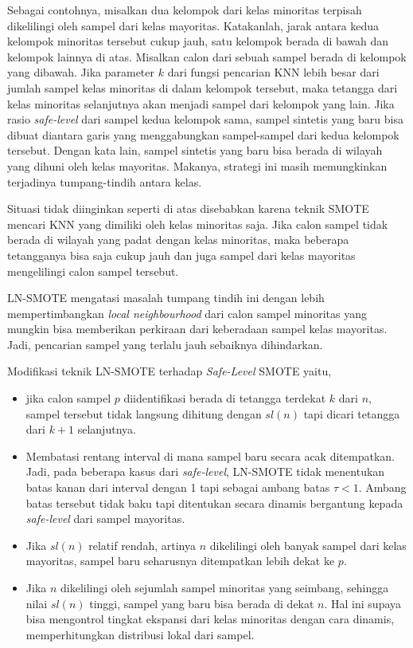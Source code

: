 Sebagai contohnya, misalkan dua kelompok dari kelas minoritas terpisah
dikelilingi oleh sampel dari kelas mayoritas.
Katakanlah, jarak antara kedua kelompok minoritas tersebut cukup jauh, satu
kelompok berada di bawah dan kelompok lainnya di atas.
Misalkan calon dari sebuah sampel berada di kelompok yang dibawah.
Jika parameter $ k $ dari fungsi pencarian KNN lebih besar dari jumlah sampel
kelas minoritas di dalam kelompok tersebut, maka tetangga dari kelas minoritas
selanjutnya akan menjadi sampel dari kelompok yang lain.
Jika rasio \textit{safe-level} dari sampel kedua kelompok sama, sampel sintetis
yang baru bisa dibuat diantara garis yang menggabungkan sampel-sampel dari
kedua kelompok tersebut.
Dengan kata lain, sampel sintetis yang baru bisa berada di wilayah yang dihuni
oleh kelas mayoritas.  Makanya, strategi ini masih memungkinkan terjadinya
tumpang-tindih antara kelas.

Situasi tidak diinginkan seperti di atas disebabkan karena teknik SMOTE mencari
KNN yang dimiliki oleh kelas minoritas saja.
Jika calon sampel tidak berada di wilayah yang padat dengan kelas minoritas,
maka beberapa tetangganya bisa saja cukup jauh dan juga sampel dari kelas
mayoritas mengelilingi calon sampel tersebut.

LN-SMOTE mengatasi masalah tumpang tindih ini dengan lebih mempertimbangkan
\textit{local neighbourhood} dari calon sampel minoritas yang mungkin bisa
memberikan perkiraan dari keberadaan sampel kelas mayoritas.
Jadi, pencarian sampel yang terlalu jauh sebaiknya dihindarkan.

Modifikasi teknik LN-SMOTE terhadap \textit{Safe-Level} SMOTE yaitu,
\begin{itemize}
\item jika calon sampel $ p $ diidentifikasi berada di tetangga terdekat $ k
$ dari $ n $, sampel tersebut tidak langsung dihitung dengan $ sl(n) $ tapi
dicari tetangga dari $ k + 1 $ selanjutnya.
\item Membatasi rentang interval di mana sampel baru secara acak ditempatkan.
Jadi, pada beberapa kasus dari \textit{safe-level}, LN-SMOTE tidak menentukan
batas kanan dari interval dengan 1 tapi sebagai ambang batas $\tau < 1$.
Ambang batas tersebut tidak baku tapi ditentukan secara dinamis bergantung
kepada \textit{safe-level} dari sampel mayoritas.
\item Jika $ sl(n) $ relatif rendah, artinya $ n $ dikelilingi oleh banyak
sampel dari kelas mayoritas, sampel baru seharusnya ditempatkan lebih dekat ke
$ p $.
\item Jika $ n $ dikelilingi oleh sejumlah sampel minoritas yang seimbang,
sehingga nilai $ sl(n) $ tinggi, sampel yang baru bisa berada di dekat $ n $.
Hal ini supaya bisa mengontrol tingkat ekspansi dari kelas minoritas dengan
cara dinamis, memperhitungkan distribusi lokal dari sampel.
\end{itemize}

